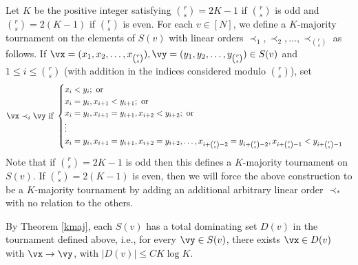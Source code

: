     Let $K$ be the positive integer satisfying $\binom{r}{s} = 2K-1$ if $\binom{r}{s}$ is odd and $\binom{r}{s} = 2(K-1)$ if $\binom{r}{s}$ is even.
    For each $v \in [N]$, we define a $K$-majority tournament on the elements of $S(v)$ with linear orders $\prec_1, \prec_2, \dots, \prec_{\binom{r}{s}}$ as follows.
    If $\vx = (x_1,x_2, \dots, x_{\binom{r}{s}}), \vy = (y_1,y_2, \dots, y_{\binom{r}{s}}) \in S(v)$ and $1 \leq i \leq \binom{r}{s}$ (with addition in the indices considered modulo $\binom{r}{s}$), set  
    \begin{equation*}
        \vx \prec_i \vy \text{ if } \begin{cases}
            x_i < y_i; \text{ or}\\
            x_i=y_i, x_{i+1} < y_{i+1}; \text{ or}\\
            x_i=y_i, x_{i+1} = y_{i+1}, x_{i+2} < y_{i+2}; \text{ or}\\
            \vdots\\
            x_i=y_i, x_{i+1} = y_{i+1}, x_{i+2} = y_{i+2}, \dots, x_{i+\binom{r}{s}-2} = y_{i+\binom{r}{s}-2}, x_{i+\binom{r}{s}-1} < y_{i+\binom{r}{s}-1}
        \end{cases}
    \end{equation*}
    Note that if $\binom{r}{s} = 2K-1$ is odd then this defines a $K$-majority tournament on $S(v)$.
    If $\binom{r}{s} = 2(K-1)$ is even, then we will force the above construction to be a $K$-majority tournament by adding an additional arbitrary linear order $\prec_{*}$ with no relation to the others.

    By Theorem \ref{kmaj}, each $S(v)$ has a total dominating set $D(v)$ in the tournament defined above, i.e., for every $\vy \in S(v)$, there exists $\vx \in D(v)$ with $\vx \to \vy$, with $|D(v)| \le C K \log K$.

